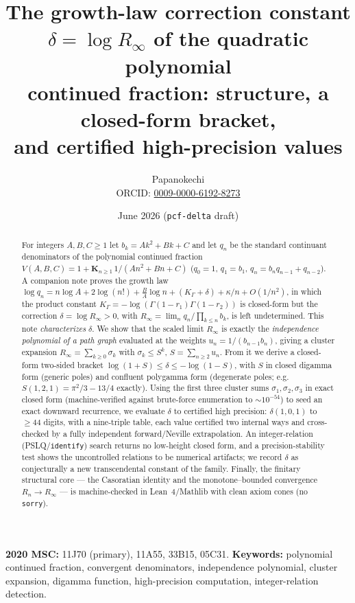\documentclass[11pt]{article}
\title{The growth-law correction constant\\
$\delta=\log R_\infty$ of the quadratic polynomial\\
continued fraction: structure, a closed-form bracket,\\
and certified high-precision values}
\author{Papanokechi\\
\small ORCID: \href{https://orcid.org/0009-0000-6192-8273}{0009-0000-6192-8273}}
\date{June 2026 \quad(\texttt{pcf-delta} draft)}
\newcommand{\Rinf}{R_\infty}
\begin{document}
\maketitle

\begin{abstract}
For integers $A,B,C\ge1$ let $b_k=Ak^2+Bk+C$ and let $q_n$ be the standard
continuant denominators of the polynomial continued fraction
$V(A,B,C)=1+\mathbf{K}_{n\ge1}\,1/(An^2+Bn+C)$ ($q_0=1$, $q_1=b_1$,
$q_n=b_nq_{n-1}+q_{n-2}$). A companion note proves the growth law
$\log q_n=n\log A+2\log(n!)+\tfrac{B}{A}\log n+(K_\Gamma+\delta)+\kappa/n+O(1/n^2)$,
in which the product constant $K_\Gamma=-\log(\Gamma(1-r_1)\Gamma(1-r_2))$ is
closed-form but the correction $\delta=\log\Rinf>0$, with
$\Rinf=\lim_n q_n/\prod_{k\le n}b_k$, is left undetermined. This note
\emph{characterizes} $\delta$. We show that the scaled limit $\Rinf$ is exactly
the \emph{independence polynomial of a path graph} evaluated at the weights
$u_n=1/(b_{n-1}b_n)$, giving a cluster expansion $\Rinf=\sum_{k\ge0}\sigma_k$ with
$\sigma_k\le S^k$, $S=\sum_{n\ge2}u_n$. From it we derive a closed-form two-sided
bracket $\log(1+S)\le\delta\le-\log(1-S)$, with $S$ in closed digamma form
(generic poles) and confluent polygamma form (degenerate poles; e.g.\
$S(1,2,1)=\pi^2/3-13/4$ exactly). Using the first three cluster sums
$\sigma_1,\sigma_2,\sigma_3$ in exact closed form (machine-verified against
brute-force enumeration to $\sim10^{-54}$) to seed an exact downward recurrence, we
evaluate $\delta$ to certified high precision: $\delta(1,0,1)$ to $\ge44$ digits,
with a nine-triple table, each value certified two internal ways and cross-checked
by a fully independent forward/Neville extrapolation. An integer-relation
(PSLQ/\texttt{identify}) search returns no low-height closed form, and a
precision-stability test shows the uncontrolled relations to be numerical
artifacts; we record $\delta$ as conjecturally a new transcendental constant of the
family. Finally, the finitary structural core --- the Casoratian identity and the
monotone--bounded convergence $R_n\to\Rinf$ --- is machine-checked in Lean~4/Mathlib
with clean axiom cones (no \texttt{sorry}).
\end{abstract}

\noindent\textbf{2020 MSC:} 11J70 (primary), 11A55, 33B15, 05C31.\quad
\textbf{Keywords:} polynomial continued fraction, convergent denominators,
independence polynomial, cluster expansion, digamma function, high-precision
computation, integer-relation detection.
\end{document}
